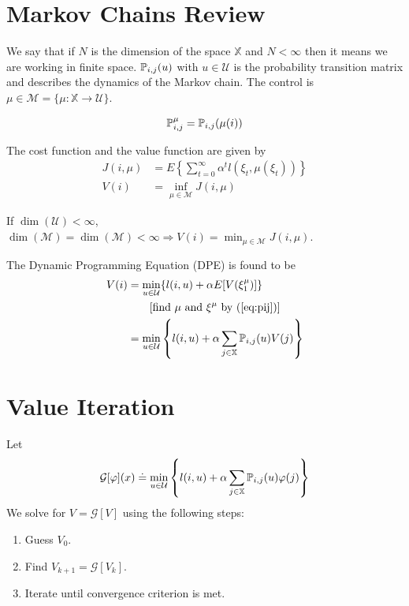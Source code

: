 
\mainmatter
\setcounter{page}{1}

\lectureseries[\course]{\course}

\date{November 3, 2009}

\setaddress

\setcounter{lecture}{10}
\setcounter{chapter}{10}


\section{Markov Chains Review}
We say that if $N$ is the dimension of the space $\mathbb{X}$ and $N<\infty$ then it means we are working in finite space. $\mathbb{P}_{i,j}(u)$ with $u\in\mathcal{U}$ is the probability transition matrix and describes the dynamics of the Markov chain. The control is $\mu\in\mathcal{M} = \{\mu:\mathbb{X}\to\mathcal{U}\}$.

\begin{align}
\label{eq:pij}
\mathbb{P}_{i,j}^\mu = \mathbb{P}_{i,j}(\mu(i))
\end{align}

The cost function and the value function are given by
\begin{align*}
J(i,\mu) &= E\left\lbrace \sum_{t=0}^\infty \alpha^tl(\xi_t,\mu(\xi_t))\right\rbrace \\
V(i) &= \inf_{\mu\in\mathcal{M}}J(i,\mu)
\end{align*}

If $\dim(\mathcal{U})<\infty$, $\dim(\mathcal{M})=\dim(\mathcal{M})<\infty\Rightarrow V(i)=\min_{\mu\in\mathcal{M}}J(i,\mu)$.

The Dynamic Programming Equation (DPE) is found to be
\begin{align}
\label{eq:mcdpe}
V(i) &= \min_{u\in\mathcal{U}}\{l(i,u)+\alpha E[V(\xi_1^\mu)]\} \nonumber \\
&\qquad [\text{find } \mu \text{ and } \xi^\mu \text{ by (\ref{eq:pij})}] \nonumber \\
&= \min_{u\in\mathcal{U}} \left\lbrace l(i,u)+\alpha\sum_{j\in\mathbb{X}}\mathbb{P}_{i,j}(u)V(j)\right\rbrace
\end{align}

\section{Value Iteration}
Let
$$\mathcal{G}[\varphi](x) \doteq \min_{u\in\mathcal{U}}\left\lbrace l(i,u)+\alpha\sum_{j\in\mathbb{X}}\mathbb{P}_{i,j}(u)\varphi(j)\right\rbrace$$
We solve for $V=\mathcal{G}[V]$ using the following steps:
\begin{enumerate}
\item Guess $V_0$.
\item Find $V_{k+1}=\mathcal{G}[V_k]$.
\item Iterate until convergence criterion is met.
\end{enumerate}

